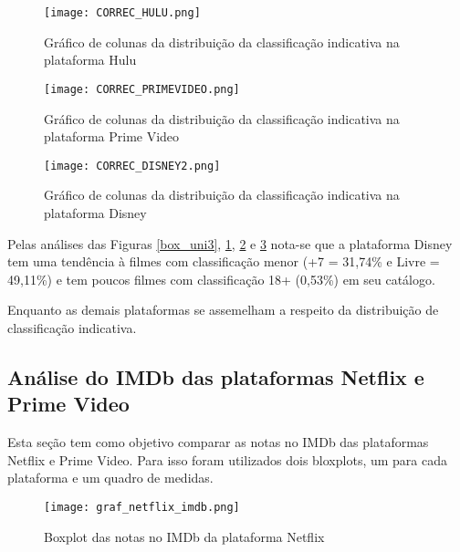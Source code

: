 \documentclass[a4paper, 12pt]{article} %
\begin{document}
\begin{figure}[H]
\cantering
\caption{Gráfico de colunas da distribuição da classificação indicativa na plataforma Hulu}
\label{box_uni4}
\texttt{[image: CORREC\_HULU.png]}
\end{figure}

\begin{figure}[H]
\cantering
\caption{Gráfico de colunas da distribuição da classificação indicativa na plataforma Prime Video}
\label{box_uni5}
\texttt{[image: CORREC\_PRIMEVIDEO.png]}
\end{figure}

\begin{figure}[H]
\cantering
\caption{Gráfico de colunas da distribuição da classificação indicativa na plataforma Disney}
\label{box_uni6}
\texttt{[image: CORREC\_DISNEY2.png]}
\end{figure}





Pelas análises das Figuras \ref{box_uni3}, \ref{box_uni4}, \ref{box_uni5} e \ref{box_uni6} nota-se que a plataforma Disney tem uma tendência à filmes com classificação menor (+7 = 31,74\% e Livre = 49,11\%) e tem poucos filmes com classificação 18+ (0,53\%) em seu catálogo.

Enquanto as demais plataformas se assemelham a respeito da distribuição de classificação indicativa.




\subsection{Análise do IMDb das plataformas Netflix e Prime Video}

Esta seção tem como objetivo comparar as notas no IMDb das plataformas Netflix e Prime Video. Para isso foram utilizados dois bloxplots, um para cada plataforma e um quadro de medidas.

\begin{figure}[H]
\cantering
\caption{Boxplot das notas no IMDb da plataforma Netflix}
\label{box_uni}
\texttt{[image: graf\_netflix\_imdb.png]}
\end{figure}
\end{document}
